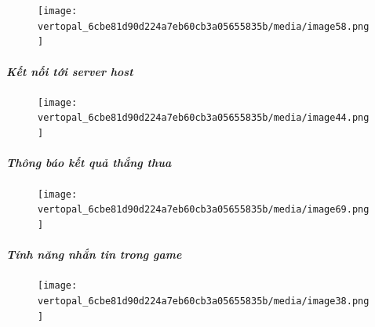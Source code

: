 \documentclass[a4paper]{article}
\begin{document}
\begin{figure}
    \centering

\texttt{[image: vertopal\_6cbe81d90d224a7eb60cb3a05655835b/media/image58.png]}

\end{figure}



\hypertarget{kux1ebft-nux1ed1i-tux1edbi-server-host}{%
\paragraph{\texorpdfstring{\emph{Kết nối tới server
host}}{Kết nối tới server host}}\label{kux1ebft-nux1ed1i-tux1edbi-server-host}}
\begin{figure}
    \centering

\texttt{[image: vertopal\_6cbe81d90d224a7eb60cb3a05655835b/media/image44.png]}

\end{figure}



\hypertarget{kux1ebft-nux1ed1i-tux1edbi-server-host}{%
\paragraph{\texorpdfstring{\emph{Thông báo kết quả thắng thua}}{Thông báo kết quả thắng thua}}\label{kux1ebft-nux1ed1i-tux1edbi-server-host}}

\begin{figure}
    \centering

\texttt{[image: vertopal\_6cbe81d90d224a7eb60cb3a05655835b/media/image69.png]}

\end{figure}



\hypertarget{kux1ebft-nux1ed1i-tux1edbi-server-host}{%
\paragraph{\texorpdfstring{\emph{Tính năng nhắn tin trong game}}{Tính năng nhắn tin trong game}}\label{kux1ebft-nux1ed1i-tux1edbi-server-host}}

\begin{figure}
    \centering

\texttt{[image: vertopal\_6cbe81d90d224a7eb60cb3a05655835b/media/image38.png]}

\end{figure}
\end{document}
